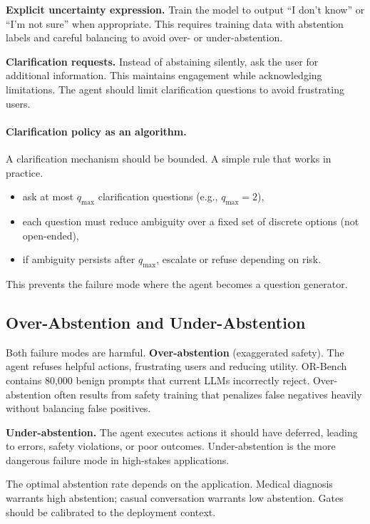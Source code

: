\textbf{Explicit uncertainty expression.} Train the model to output ``I don't know'' or ``I'm not sure'' when appropriate. This requires training data with abstention labels and careful balancing to avoid over- or under-abstention.

\textbf{Clarification requests.} Instead of abstaining silently, ask the user for additional information. This maintains engagement while acknowledging limitations. The agent should limit clarification questions to avoid frustrating users.

\paragraph{Clarification policy as an algorithm.}
A clarification mechanism should be bounded. A simple rule that works in practice.
\begin{itemize}
\item ask at most $q_{\max}$ clarification questions (e.g., $q_{\max}=2$),
\item each question must reduce ambiguity over a fixed set of discrete options (not open-ended),
\item if ambiguity persists after $q_{\max}$, escalate or refuse depending on risk.
\end{itemize}
This prevents the failure mode where the agent becomes a question generator.

\subsection{Over-Abstention and Under-Abstention}

Both failure modes are harmful. \textbf{Over-abstention} (exaggerated safety). The agent refuses helpful actions, frustrating users and reducing utility. OR-Bench \cite{cui2024orbench} contains 80,000 benign prompts that current LLMs incorrectly reject. Over-abstention often results from safety training that penalizes false negatives heavily without balancing false positives.

\textbf{Under-abstention.} The agent executes actions it should have deferred, leading to errors, safety violations, or poor outcomes. Under-abstention is the more dangerous failure mode in high-stakes applications.

The optimal abstention rate depends on the application. Medical diagnosis warrants high abstention; casual conversation warrants low abstention. Gates should be calibrated to the deployment context.

